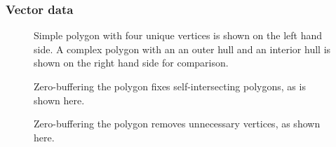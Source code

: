 \subsubsection{Vector data}

\begin{figure}[htb]
  \centering
  
  \textcolor{gray}{\vrule}
  \hspace{0.01\linewidth}
  
  \caption{
    Simple polygon with four unique vertices is shown on the left hand side.
    A complex polygon with an an outer hull
    and an interior hull is shown on the right hand side for comparison.
  }
\end{figure}

\begin{figure}[H]
  \centering
  
  \caption{Zero-buffering the polygon fixes self-intersecting polygons, as is shown here.}
\end{figure}

\begin{figure}[H]
  \centering
  
  \caption{Zero-buffering the polygon removes unnecessary vertices, as shown here.}
\end{figure}
